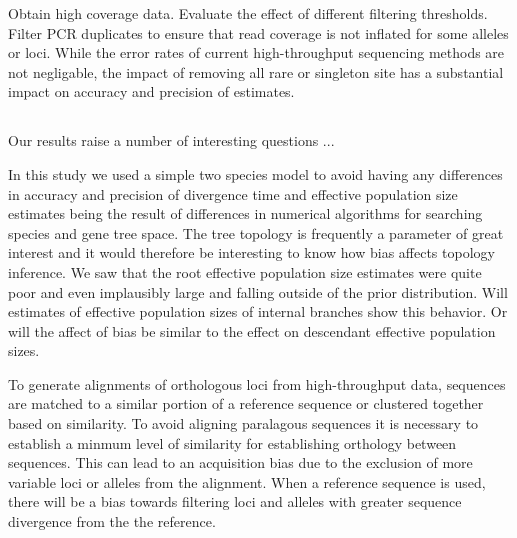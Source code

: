 Obtain high coverage data.
Evaluate the effect of different filtering thresholds.
Filter PCR duplicates to ensure that read coverage is not inflated for some
alleles or loci. 
While the error rates of current high-throughput sequencing methods are not 
negligable, the impact of removing all rare or singleton site has a substantial 
impact on accuracy and precision of estimates. 


\subsection{}
Our results raise a number of interesting questions ...

In this study we used a simple two species model to avoid having any differences
in accuracy and precision of divergence time and effective population size
estimates being the result of differences in
numerical algorithms for searching species and gene tree space.
The tree topology is frequently a parameter of great interest and it would
therefore be interesting to know how bias affects topology inference.
We saw that the root effective population size estimates were quite poor and 
even implausibly large and falling outside of the prior distribution. Will
estimates of effective population sizes of internal branches show this behavior.
Or will the affect of bias be similar to the effect on descendant effective 
population sizes.

To generate alignments of orthologous loci from high-throughput data, 
sequences are matched to a similar portion of a reference sequence or 
clustered together based on similarity. To avoid aligning paralagous sequences 
it is necessary to establish a minmum level of similarity for establishing 
orthology between sequences. This can lead to an acquisition bias due to the 
exclusion of more variable loci or alleles from the alignment. When a reference 
sequence is used, there will be a bias towards filtering loci and alleles with 
greater sequence divergence from the the reference. 



